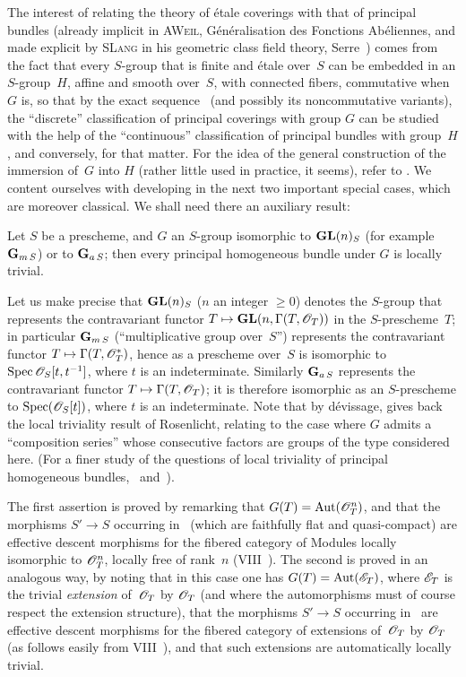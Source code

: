 The interest of relating the theory of \'etale
coverings with that of principal bundles (already
implicit in \textsc{A\ptbl Weil}, G\'en\'eralisation des Fonctions
Ab\'eliennes, and made explicit by \textsc{S\ptbl Lang} in his
geometric class field theory, \cf Serre~\cite{XI.5}) comes from the fact
that every $S$-group that is finite and \'etale over~$S$ can be embedded
in an $S$-group~$H$, affine and smooth over~$S$, with
connected fibers, commutative when $G$ is, so that by the exact
sequence~ (and possibly its noncommutative
variants), the ``discrete'' classification of principal
coverings with group $G$ can be studied with the help of the
``continuous'' classification of principal bundles with group~$H$,
and conversely, for that matter. For the idea of the
general construction of the immersion of~$G$ into $H$ (rather little
used in practice, it seems), refer to
\cite[VI~2.8]{XI.5}. We content ourselves with developing in the next \No
two important special cases, which are moreover classical. We shall
need there an auxiliary result:

\begin{proposition}
\label{XI.5.1}
Let
$S$ be a prescheme, and $G$ an $S$-group isomorphic to
$\operatorname{\mathbf{GL}}(n)_S$ (for example $\mathbf{G}_{m\,S}$) or to $\mathbf{G}_{a\,S}$; then every
principal homogeneous bundle under $G$ is locally trivial.
\end{proposition}

Let us make precise that $\operatorname{\mathbf{GL}}(n)_S$ ($n$ an integer $\geq 0$) denotes the
$S$-group that represents the contravariant functor $T\mto
\Gl(n,\Gamma(T,\cal{O}_T))$ in the $S$-prescheme~$T$; in
particular $\mathbf{G}_{m\,S}$ (``multiplicative group over~$S$'')
represents the contravariant functor $T\mto
\Gamma(T,\cal{O}_T^*)$, hence as a prescheme over~$S$ is
isomorphic to $\Spec {\cal{O}_S[t,t^{-1}]}$, where $t$ is an
indeterminate. Similarly $\mathbf{G}_{a\,S}$ represents the
contravariant functor $T\mto \Gamma(T,\cal{O}_T)$; it is therefore
isomorphic as an $S$-prescheme to $\Spec(\cal{O}_S[t])$,
where $t$ is an indeterminate. Note that by d\'evissage,
 gives back the local triviality result of
Rosenlicht, relating to the case where $G$ admits a ``composition
series'' whose consecutive factors are groups of the
type considered here. (For a finer study of the questions of
local triviality of principal homogeneous bundles,
\cf \cite{XI.7}~and~\cite{XI.3}).

The first assertion is proved by remarking that
$G(T)=\Aut(\cal{O}_T^n)$, and that the morphisms $S'\to S$ occurring
in~ (\ie which are faithfully flat and
quasi-compact) are effective descent morphisms for the
fibered category of Modules locally isomorphic to
$\cal{O}_T^n$, \ie locally free of rank~$n$
(VIII~). The second is proved in an
analogous way, by noting that in this case one has $G(T)=\Aut(\cal{E}_T)$,
where $\cal{E}_T$ is the trivial \emph{extension} of~$\cal{O}_T$ by
$\cal{O}_T$ (and where the automorphisms must of course
respect the extension structure), that the morphisms $S'\to S$
occurring in~ are effective descent
morphisms for the fibered category of extensions of~$\cal{O}_T$ by $\cal{O}_T$ (as follows easily from
VIII~), and that such extensions are automatically
locally trivial.


